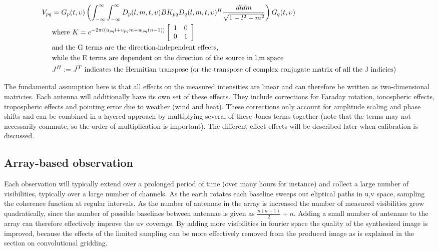 \documentclass[a4paper,10pt]{report}
\begin{document}
\begin{equation}
\label{eqn_RIME}
\begin{split}
    V_{pq} &= G_p(t,\upsilon)\left(\int_{-\infty}^{\infty}\int_{-\infty}^{\infty}D_p(l,m,t,\upsilon)BK_{pq}D_q(l,m,t,\upsilon)^H\frac{dldm}{\sqrt{1-l^2-m^2}}\right)G_q(t,\upsilon)\\
	  &\text{where }K = e^{-2\pi i(u_{pq}l+v_{pq}m+w_{pq}(n-1))}
    \left[\begin{array}{c c}
     1 & 0 \\
     0 & 1 \\
    \end{array}\right]\\
	 &\text{and the G terms are the direction-independent effects,}\\
	 &\text{while the E terms are dependent on the direction of the source in l,m space}\\
 	 &J^H:=\bar J^T \text{ indicates the Hermitian transpose (or the transpose of complex conjugate matrix of all the J indicies)}\\ 
\end{split}
\end{equation}

The fundamental assumption here is that all effects on the measured intensities are linear and can therefore be written as two-dimensional matricies. Each antenna will additionally have its own set of these effects. 
They include corrections for Faraday rotation, ionospheric effects, tropospheric effects and pointing error due to weather (wind and heat). These corrections only account for amplitude scaling and phase shifts and can be 
combined in a layered approach by multiplying several of these Jones terms together (note that the terms may not necessarily commute, so the order of multiplication is important). The different effect effects will be described 
later when calibration is discussed.

\subsection{Array-based observation}
Each observation will typically extend over a prolonged period of time (over many hours for instance) and collect a large number of visibilities, typically over a large number of channels. As the earth rotates each baseline sweeps out
eliptical paths in u,v space, sampling the coherence function at regular intervals. As the number of antennae in the array is increased the number of measured visibilities grow quadratically, since the number of possible baselines between 
antennae is given as $\frac{n(n-1)}{2}+n$. Adding a small number of antennae to the array can therefore effectively improve the uv coverage. By adding more visibilities in fourier space the quality of the synthesized 
image is improved, because the effects of the limited sampling can be more effectively removed from the produced image as is explained in the section on convolutional gridding.
\end{document}
